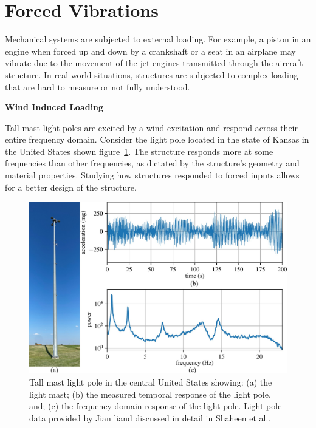 \documentclass[12pt,letter]{article}
\begin{document}
	
	\setcounter{section}{2}	
	\setcounter{figure}{0}   
	\renewcommand\thefigure{\thesection.\arabic{figure}}
	\setcounter{equation}{0}   
	\renewcommand\theequation{\thesection.\arabic{equation}}

\section{Forced Vibrations}




	Mechanical systems are subjected to external loading. For example, a piston in an engine when forced up and down by a crankshaft or a seat in an airplane may vibrate due to the movement of the jet engines transmitted through the aircraft structure.  In real-world situations, structures are subjected to complex loading that are hard to measure or not fully understood. 



	\begin{vibration_case_study}
			\textbf{Wind Induced Loading}

	\noindent Tall mast light poles are excited by a wind excitation and respond across their entire frequency domain. Consider the light pole located in the state of Kansas in the United States shown figure~\ref{fig:Li_pole_vibrations}. The structure responds more at some frequencies than other frequencies, as dictated by the structure's geometry and material properties. Studying how structures responded to forced inputs allows for a better design of the structure.  
		\begin{figure}[H]
			\centering
			\includegraphics[width=6in]{../figures/Li_pole_vibrations}
			\caption{Tall mast light pole in the central United States showing: (a) the light mast; (b) the measured temporal response of the light pole, and; (c) the frequency domain response of the light pole. Light pole data provided by Jian li\protect\footnotemark[1] and discussed in detail in Shaheen et al.\protect\footnotemark[2].}
			\label{fig:Li_pole_vibrations}
		\end{figure}
	\end{vibration_case_study}
\end{document}
